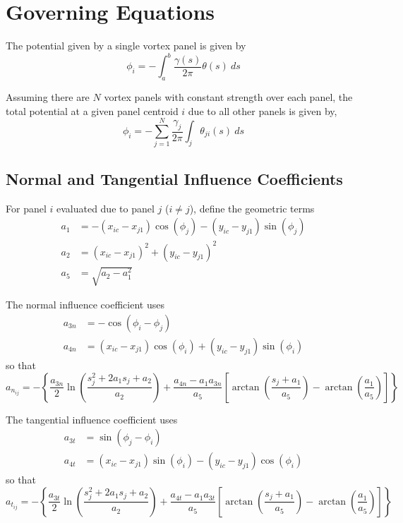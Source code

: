 \section{Governing Equations}
\label{sec:governing_equations}

The potential given by a single vortex panel is given by
\[
    \phi_i = -\int_{a}^{b} \frac{\gamma(s)}{2\pi} \theta(s) \ ds
\]

Assuming there are $N$ vortex panels with constant strength over each panel, the total potential at a given panel
centroid $i$ due to all other panels is given by,
\[
    \phi_i = -\sum_{j=1}^{N} \frac{\gamma_j}{2\pi} \int_{j} \theta_{ji}(s) \ ds
\]

\subsection{Normal and Tangential Influence Coefficients}
\label{subsec:normal_and_tangential_influence_coefficients}

For panel $i$ evaluated due to panel $j$ ($i \neq j$), define the geometric terms
\begin{align*}
a_1 &= -(x_{ic} - x_{j1})\cos(\phi_j) - (y_{ic} - y_{j1})\sin(\phi_j) \\
a_2 &= (x_{ic} - x_{j1})^2 + (y_{ic} - y_{j1})^2 \\
a_5 &= \sqrt{a_2 - a_1^2}
\end{align*}

The normal influence coefficient uses
\begin{align*}
a_{3n} &= -\cos(\phi_i - \phi_j) \\
a_{4n} &= (x_{ic} - x_{j1})\cos(\phi_i) + (y_{ic} - y_{j1})\sin(\phi_i)
\end{align*}
so that
\[
a_{n_{ij}} = -\left\{\frac{a_{3n}}{2} \ln\!\left(\frac{s_j^2 + 2 a_1 s_j + a_2}{a_2}\right) + \frac{a_{4n} - a_1 a_{3n}}{a_5}\left[\arctan\!\left(\frac{s_j + a_1}{a_5}\right) - \arctan\!\left(\frac{a_1}{a_5}\right)\right]\right\}
\]

The tangential influence coefficient uses
\begin{align*}
a_{3t} &= \sin(\phi_j - \phi_i) \\
a_{4t} &= (x_{ic} - x_{j1})\sin(\phi_i) - (y_{ic} - y_{j1})\cos(\phi_i)
\end{align*}
so that
\[
a_{t_{ij}} = -\left\{\frac{a_{3t}}{2} \ln\!\left(\frac{s_j^2 + 2 a_1 s_j + a_2}{a_2}\right) + \frac{a_{4t} - a_1 a_{3t}}{a_5}\left[\arctan\!\left(\frac{s_j + a_1}{a_5}\right) - \arctan\!\left(\frac{a_1}{a_5}\right)\right]\right\}
\]

